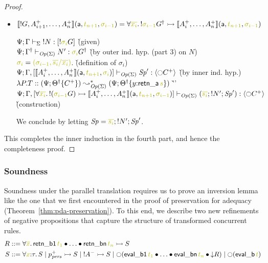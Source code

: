 \begin{proof}
\begin{itemize}
\item $\opbasic{{!}G,A^+_{i+1},\ldots,A^+_n}{t_{n+1}}{\sigma_{i-1}} = \forall
  \lf{\overline{x_i}}.\, {!}\lf{\sigma_{i-1}}\opsubst{G} \lefti
  \opbasic{A^+_i,\ldots,A^+_n}{t_{n+1}}{\sigma_{i-1}}$

  \begin{tabbing}
  $\slst{\Sigma}{\Psi}{\Gamma}{\tbangr{N}}{[{!}\lf{\sigma_i}{G}]}$
  \` (given) 
  \\
  $\slst{\transop{\Sigma}}{\Psi}{\opsubst{\Gamma}}{N'}{\lf{\sigma_i}{\opsubst{G}}}$
  \` (by outer ind. hyp. (part 3)  on $N$) 
  \\
  $\lf{\sigma_i} = \lf{(\sigma_{i-1}, \overline{s_i}/\overline{x_i})}$.
  \` (definition of $\sigma_i$)
  \\
  $\slst{\transop{\Sigma}}{\Psi}{\Gamma, [\opbasic{A^+_i,\ldots,A^+_n}{t_{n+1}}{\sigma_{i}}]}{\Sp'}{\susp{{\ocircle}C^+}}$
  \` (by inner ind. hyp.)
  \\
  $\lambda P.T :: (\Psi; \tackon{\opsubst{\Theta}}{C^+}) \leadsto^*_{\transop{\Sigma}}
   (\Psi; \tackon{\opsubst{\Theta}}{y{:}{\sf retn\_a}\,\lf{s}})$
 \` ''\qquad\qquad~
  \\
  $\slst{\transop{\Sigma}}{\Psi}
    {\Gamma, [\forall \lf{\overline{x_i}}.\, {!}(\lf{\sigma_{i-1}}{G})
                \lefti \opbasic{A^+_i,\ldots,A^+_n}{t_{n+1}}{\sigma_{i-1}}]}
    {(\lf{\overline{s_i}}; \tbangr{N'}; \Sp')}
    {\susp{{\ocircle}C^+}}$
  \\ 
  \` (construction)
  \end{tabbing}
  We conclude  by letting $\Sp = \lf{\overline{s_i}}; \tbangr{N'}; \Sp'$.
\end{itemize}

\noindent
This completes the inner induction in the fourth part, and hence
the completeness proof.
\end{proof}

\subsubsection{Soundness}

Soundness under the parallel translation requires us to prove an
inversion lemma like the one that we first encountered in the proof of
preservation for adequacy (Theorem~\ref{thm:pda-preservation}).
To this end, we describe two new refinements of negative
propositions that capture the structure of transformed concurrent
rules. 
\begin{align*}
R & ::= \forall \lf{\overline{x}}.\,{\sf retn\_b1}\,\lf{t_1} \fuse \ldots \fuse {\sf retn\_bn}\,\lf{t_n} \lefti S
\\
S & ::= \forall \lf{x}{:}\tau.\,S 
   \mid p^+_\mpers \lefti S
   \mid {!}A^- \lefti S
   \mid {\ocircle}({\sf eval\_b1}\,\lf{t_1} \fuse \ldots \fuse {\sf eval\_bn}\,\lf{t_n} 
           \fuse {\downarrow}R)
   \mid {\ocircle}({\sf eval\_b}\,\lf{t})
\end{align*}

